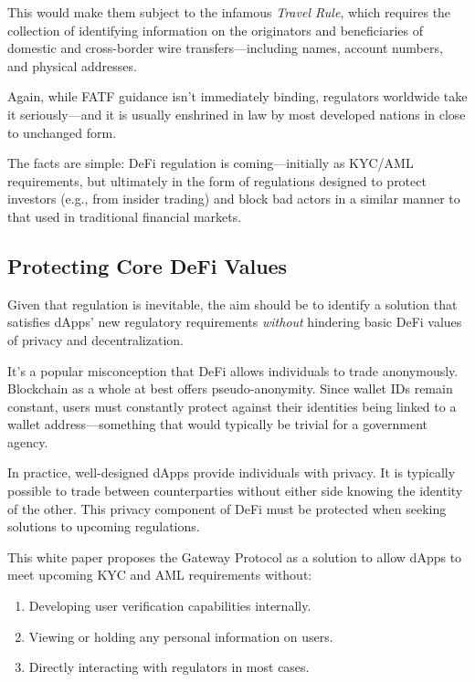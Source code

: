 This would make them subject to the infamous \emph{Travel Rule}, which requires the collection of identifying information on the originators and beneficiaries of domestic and cross-border wire transfers—including names, account numbers, and physical addresses.

Again, while FATF guidance isn’t immediately binding, regulators worldwide take it seriously—and it is usually enshrined in law by most developed nations in close to unchanged form.

The facts are simple: DeFi regulation is coming—initially as KYC/AML requirements, but ultimately in the form of regulations designed to protect investors (e.g., from insider trading) and block bad actors in a similar manner to that used in traditional financial markets.

\subsection{Protecting Core DeFi Values}
Given that regulation is inevitable, the aim should be to identify a solution that satisfies dApps’ new regulatory requirements \emph{without} hindering basic DeFi values of privacy and decentralization.

\begin{tcolorbox}[width=\textwidth,colback={light-gray},title={\textbf{Privacy vs. Anonymity (and Why it Matters)}},colbacktitle=light-gray,coltitle=black]
It’s a popular misconception that DeFi allows individuals to trade anonymously. Blockchain as a whole at best offers pseudo-anonymity. Since wallet IDs remain constant, users must constantly protect against their identities being linked to a wallet address—something that would typically be trivial for a government agency.

In practice, well-designed dApps provide individuals with privacy. It is typically possible to trade between counterparties without either side knowing the identity of the other. This privacy component of DeFi must be protected when seeking solutions to upcoming regulations.
\end{tcolorbox}

This white paper proposes the Gateway Protocol as a solution to allow dApps to meet upcoming KYC and AML requirements without:

\begin{enumerate}
\item Developing user verification capabilities internally.
\item Viewing or holding any personal information on users.
\item Directly interacting with regulators in most cases.
\end{enumerate}

